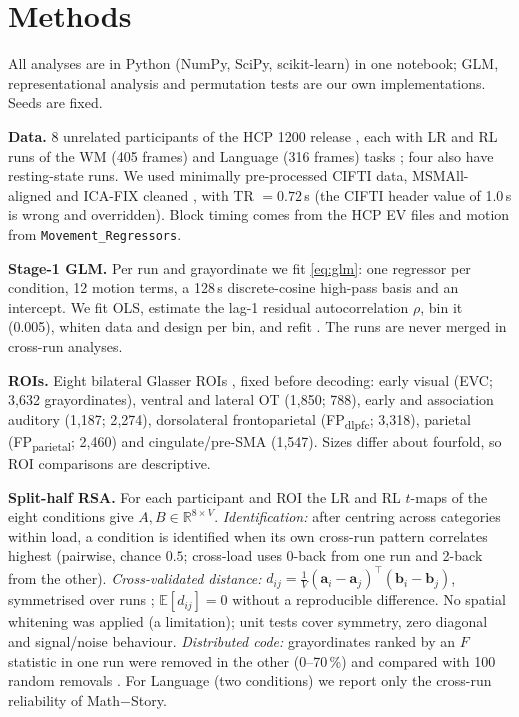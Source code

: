 \documentclass[conference]{IEEEtran}
\newcommand{\Nsub}{8}
\begin{document}
\section{Methods}
All analyses are in Python (NumPy, SciPy, scikit-learn) in one notebook; GLM, representational analysis and permutation tests are our own implementations. Seeds are fixed.

\textbf{Data.} \Nsub{} unrelated participants of the HCP 1200 release \cite{vanessen2013}, each with LR and RL runs of the WM (405 frames) and Language (316 frames) tasks \cite{barch2013,binder2011}; four also have resting-state runs. We used minimally pre-processed CIFTI data, MSMAll-aligned \cite{robinson2014} and ICA-FIX cleaned \cite{salimi2014}, with TR $=0.72$\,s (the CIFTI header value of 1.0\,s is wrong and overridden). Block timing comes from the HCP EV files and motion from \texttt{Movement\_Regressors}.

\textbf{Stage-1 GLM.} Per run and grayordinate we fit \eqref{eq:glm}: one regressor per condition, 12 motion terms, a 128\,s discrete-cosine high-pass basis and an intercept. We fit OLS, estimate the lag-1 residual autocorrelation $\rho$, bin it (0.005), whiten data and design per bin, and refit \cite{woolrich2001}. The runs are never merged in cross-run analyses.

\textbf{ROIs.} Eight bilateral Glasser ROIs \cite{glasser2016}, fixed before decoding: early visual (EVC; 3{,}632 grayordinates), ventral and lateral OT (1{,}850; 788), early and association auditory (1{,}187; 2{,}274), dorsolateral frontoparietal (FP\textsubscript{dlpfc}; 3{,}318), parietal (FP\textsubscript{parietal}; 2{,}460) and cingulate/pre-SMA (1{,}547). Sizes differ about fourfold, so ROI comparisons are descriptive.

\textbf{Split-half RSA.} For each participant and ROI the LR and RL $t$-maps of the eight conditions give $A,B\in\mathbb{R}^{8\times V}$. \emph{Identification:} after centring across categories within load, a condition is identified when its own cross-run pattern correlates highest (pairwise, chance $0.5$; cross-load uses 0-back from one run and 2-back from the other). \emph{Cross-validated distance:} $d_{ij}=\tfrac1V(\mathbf a_i-\mathbf a_j)^{\!\top}(\mathbf b_i-\mathbf b_j)$, symmetrised over runs \cite{walther2016,nili2014}; $\mathbb E[d_{ij}]=0$ without a reproducible difference. No spatial whitening was applied (a limitation); unit tests cover symmetry, zero diagonal and signal/noise behaviour. \emph{Distributed code:} grayordinates ranked by an $F$ statistic in one run were removed in the other (0--70\,\%) and compared with 100 random removals \cite{haxby2001}. For Language (two conditions) we report only the cross-run reliability of Math$-$Story.
\end{document}

